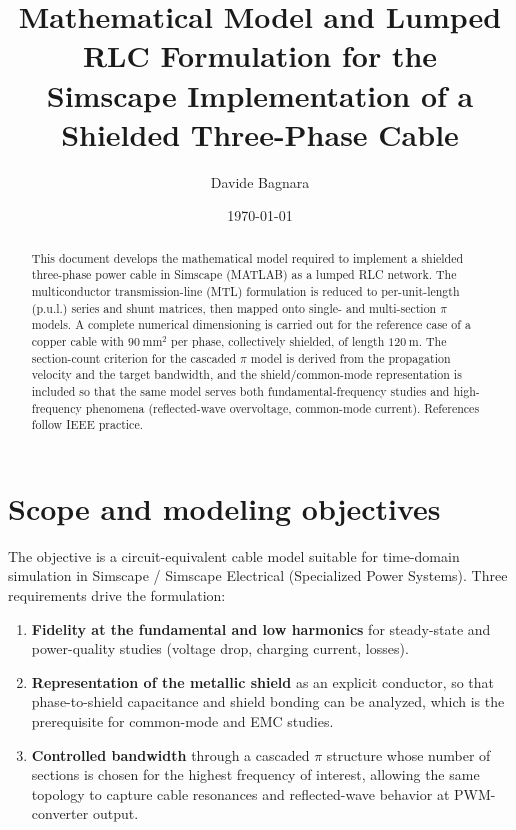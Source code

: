 \documentclass[11pt,a4paper]{article}
\title{\textbf{Mathematical Model and Lumped RLC Formulation for the\\
Simscape Implementation of a Shielded Three-Phase Cable}}
\author{Davide Bagnara}
\date{\today}
\begin{document}
\maketitle

\begin{abstract}
\noindent
This document develops the mathematical model required to implement a shielded
three-phase power cable in Simscape (MATLAB) as a lumped RLC network. The
multiconductor transmission-line (MTL) formulation is reduced to per-unit-length
(p.u.l.) series and shunt matrices, then mapped onto single- and multi-section
$\pi$ models. A complete numerical dimensioning is carried out for the reference
case of a copper cable with $90\ \mathrm{mm^2}$ per phase, collectively shielded,
of length $120\ \mathrm{m}$. The section-count criterion for the cascaded $\pi$
model is derived from the propagation velocity and the target bandwidth, and the
shield/common-mode representation is included so that the same model serves both
fundamental-frequency studies and high-frequency phenomena (reflected-wave
overvoltage, common-mode current). References follow IEEE practice.
\end{abstract}

\tableofcontents
\bigskip

\section{Scope and modeling objectives}
The objective is a circuit-equivalent cable model suitable for time-domain
simulation in Simscape / Simscape Electrical (Specialized Power Systems). Three
requirements drive the formulation:

\begin{enumerate}[leftmargin=*]
\item \textbf{Fidelity at the fundamental and low harmonics} for steady-state and
power-quality studies (voltage drop, charging current, losses).
\item \textbf{Representation of the metallic shield} as an explicit conductor, so
that phase-to-shield capacitance and shield bonding can be analyzed, which is the
prerequisite for common-mode and EMC studies.
\item \textbf{Controlled bandwidth} through a cascaded $\pi$ structure whose number
of sections is chosen for the highest frequency of interest, allowing the same
topology to capture cable resonances and reflected-wave behavior at PWM-converter
output.
\end{enumerate}
\end{document}
